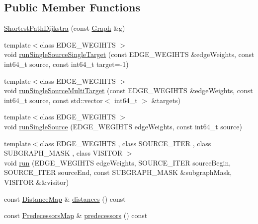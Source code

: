 \subsection*{Public Member Functions}
\begin{DoxyCompactItemize}
\item 
\hyperlink{classnifty_1_1graph_1_1ShortestPathDijkstra_acb13df0b0c2900bd1e937f061f8cc65c}{Shortest\+Path\+Dijkstra} (const \hyperlink{classnifty_1_1graph_1_1ShortestPathDijkstra_abf7e8e078818d19f973eebe1784f6716}{Graph} \&g)
\item 
{\footnotesize template$<$class E\+D\+G\+E\+\_\+\+W\+E\+G\+I\+H\+T\+S $>$ }\\void \hyperlink{classnifty_1_1graph_1_1ShortestPathDijkstra_ab199118e6b805700d5330563401fe39d}{run\+Single\+Source\+Single\+Target} (const E\+D\+G\+E\+\_\+\+W\+E\+G\+I\+H\+T\+S \&edge\+Weights, const int64\+\_\+t source, const int64\+\_\+t target=-\/1)
\item 
{\footnotesize template$<$class E\+D\+G\+E\+\_\+\+W\+E\+G\+I\+H\+T\+S $>$ }\\void \hyperlink{classnifty_1_1graph_1_1ShortestPathDijkstra_ac73da5c1ffcd7367ae159264895cc1fc}{run\+Single\+Source\+Multi\+Target} (const E\+D\+G\+E\+\_\+\+W\+E\+G\+I\+H\+T\+S \&edge\+Weights, const int64\+\_\+t source, const std\+::vector$<$ int64\+\_\+t $>$ \&targets)
\item 
{\footnotesize template$<$class E\+D\+G\+E\+\_\+\+W\+E\+G\+I\+H\+T\+S $>$ }\\void \hyperlink{classnifty_1_1graph_1_1ShortestPathDijkstra_ad5f769f5a2acc76b6b0e8914cafd1eb1}{run\+Single\+Source} (E\+D\+G\+E\+\_\+\+W\+E\+G\+I\+H\+T\+S edge\+Weights, const int64\+\_\+t source)
\item 
{\footnotesize template$<$class E\+D\+G\+E\+\_\+\+W\+E\+G\+I\+H\+T\+S , class S\+O\+U\+R\+C\+E\+\_\+\+I\+T\+E\+R , class S\+U\+B\+G\+R\+A\+P\+H\+\_\+\+M\+A\+S\+K , class V\+I\+S\+I\+T\+O\+R $>$ }\\void \hyperlink{classnifty_1_1graph_1_1ShortestPathDijkstra_a3772fbcff8a5baa69b3884e69849380d}{run} (E\+D\+G\+E\+\_\+\+W\+E\+G\+I\+H\+T\+S edge\+Weights, S\+O\+U\+R\+C\+E\+\_\+\+I\+T\+E\+R source\+Begin, S\+O\+U\+R\+C\+E\+\_\+\+I\+T\+E\+R source\+End, const S\+U\+B\+G\+R\+A\+P\+H\+\_\+\+M\+A\+S\+K \&subgraph\+Mask, V\+I\+S\+I\+T\+O\+R \&\&visitor)
\item 
const \hyperlink{classnifty_1_1graph_1_1ShortestPathDijkstra_a87e51b119ce8d43b03c913527ff3a4c9}{Distance\+Map} \& \hyperlink{classnifty_1_1graph_1_1ShortestPathDijkstra_ad6163b3d85e34b8e857b5a3f27c3efbb}{distances} () const 
\item 
const \hyperlink{classnifty_1_1graph_1_1ShortestPathDijkstra_a61f6bc245259c631182b51c3eb34785b}{Predecessors\+Map} \& \hyperlink{classnifty_1_1graph_1_1ShortestPathDijkstra_a7e8d4715856c89271e44c1f56c162f57}{predecessors} () const 
\end{DoxyCompactItemize}


